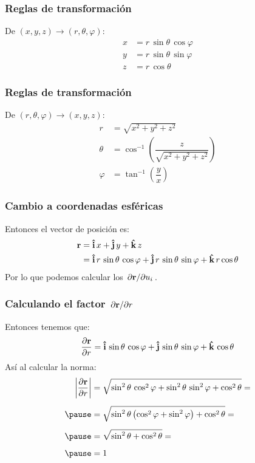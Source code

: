 \documentclass[12pt]{beamer}
\begin{document}
\begin{frame}
\frametitle{Reglas de transformación}
De $(x, y, z) \rightarrow (r, \theta, \varphi)$:
\begin{align*}
x &= r \, \sin \theta \, \cos \varphi \\
y &= r \, \sin \theta \, \sin \varphi \\
z &= r \, \cos \theta
\end{align*}
\end{frame}
\begin{frame}
\frametitle{Reglas de transformación}
De $(r, \theta, \varphi) \rightarrow (x, y, z)$:
\begin{align*}
r &= \sqrt{x^{2} + y^{2} + z^{2}} \\[0.75em]
\theta &= \cos^{-1} \left( \dfrac{z}{\sqrt{x^{2} + y^{2} + z^{2}}} \right) \\[0.75em]
\varphi &= \tan^{-1} \left( \dfrac{y}{x} \right)
\end{align*}
\end{frame}
\begin{frame}
\frametitle{Cambio a coordenadas esféricas}
Entonces el vector de posición es:
\pause
\begin{align}
\begin{aligned}
\vb{r} &= \vu{i} \, x + \vu{j} \, y + \vu{k} \, z \\
&= \vu{i} \, r \, \sin \theta \, \cos \varphi + \vu{j} \, r \, \sin \theta \, \sin \varphi + \vu{k} \, r \cos \theta 
\end{aligned}
\label{eq:ecuacion_01_06}
\end{align}
\pause
Por lo que podemos calcular los $\pdv*{\vb{r}}{u_{i}}$.
\end{frame}
\begin{frame}
\frametitle{Calculando el factor $\pdv*{\vb{r}}{r}$}
Entonces tenemos que:
\pause
\begin{align*}
\pdv{\vb{r}}{r} = \vu{i} \, \sin \theta \, \cos \varphi + \vu{j} \, \sin \theta \, \sin \varphi + \vu{k} \, \cos \theta
\end{align*}
Así al calcular la norma:
\pause
\begin{eqnarray*}
\begin{aligned}
\abs{\pdv{\vb{r}}{r}} &= \sqrt{\sin^{2} \theta \, \cos^{2} \varphi + \sin^{2} \theta \, \sin^{2} \varphi + \cos^{2} \theta} = \\[0.5em] \pause
&= \sqrt{\sin^{2} \theta \left( \cos^{2} \varphi + \sin^{2} \varphi \right) + \cos^{2} \theta} = \\[0.5em] \pause
&= \sqrt{\sin^{2} \theta + \cos^{2} \theta} = \\[0.5em] \pause
&= 1
\end{aligned}
\end{eqnarray*}
\end{frame}
\end{document}
